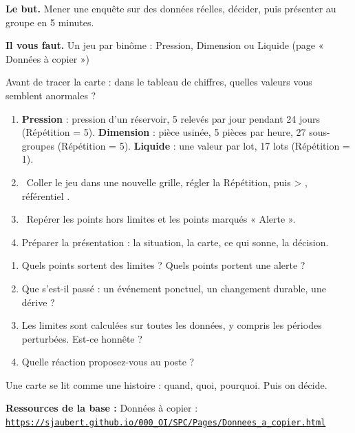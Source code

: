 \documentclass[10pt,a4paper]{article}
\begin{document}
\thispagestyle{fancy}
\begin{tcolorbox}[boite]\textbf{Le but.} Mener une enquête sur des données réelles, décider, puis présenter au groupe en 5 minutes.\par\textbf{Il vous faut.} Un jeu par binôme : Pression, Dimension ou Liquide (page « Données à copier »)\end{tcolorbox}
\begin{tcolorbox}[pred]Avant de tracer la carte : dans le tableau de chiffres, quelles valeurs vous semblent anormales ?\reponse\end{tcolorbox}
\begin{enumerate}[label=\textcolor{cyan}{\textbf{\arabic*.}},leftmargin=15pt,itemsep=1.5pt]
\item \textbf{Pression} : pression d'un réservoir, 5 relevés par jour pendant 24 jours (Répétition = 5). \textbf{Dimension} : pièce usinée, 5 pièces par heure, 27 sous-groupes (Répétition = 5). \textbf{Liquide} : une valeur par lot, 17 lots (Répétition = 1).
\item \tagE\ Coller le jeu dans une nouvelle grille, régler la Répétition, puis  > , référentiel .
\item \tagE\ Repérer les points hors limites et les points marqués « Alerte ».
\item Préparer la présentation : la situation, la carte, ce qui sonne, la décision.
\end{enumerate}
\begin{enumerate}[label=\textcolor{cyan}{\textbf{Q\arabic*.}},leftmargin=22pt]
\item Quels points sortent des limites ? Quels points portent une alerte ?\reponse[2]
\item Que s'est-il passé : un événement ponctuel, un changement durable, une dérive ?\reponse[2]
\item Les limites sont calculées sur toutes les données, y compris les périodes perturbées. Est-ce honnête ?\reponse[2]
\item Quelle réaction proposez-vous au poste ?\reponse[2]
\end{enumerate}
\begin{tcolorbox}[retenir]Une carte se lit comme une histoire : quand, quoi, pourquoi. Puis on décide.\end{tcolorbox}
\vfill{\footnotesize\color{uimm}\textbf{Ressources de la base :} Données à copier : \href{https://sjaubert.github.io/000_OI/SPC/Pages/Donnees_a_copier.html\#pression}{\nolinkurl{https://sjaubert.github.io/000_OI/SPC/Pages/Donnees_a_copier.html}}}
\end{document}

